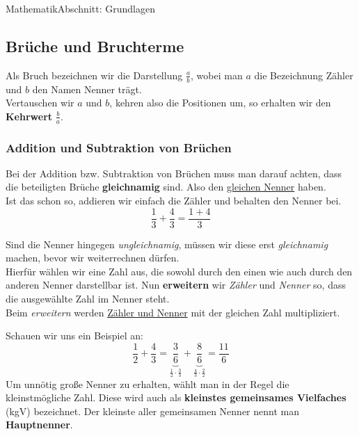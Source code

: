 \documentclass[11pt,twocolumn,oneside,openany,headings=optiontotoc,11pt,numbers=noenddot]{article}
\begin{document}
\begin{worksheet}{}{Mathematik}{Abschnitt: Grundlagen}
		\subsection{Brüche und Bruchterme}
		Als Bruch bezeichnen wir die Darstellung \(\frac{a}{b}\), wobei man \(a\) die Bezeichnung Zähler und \(b\) den Namen Nenner trägt.\\
		Vertauschen wir \(a\) und \(b\), kehren also die Positionen um, so erhalten wir den \textbf{Kehrwert} \(\frac{b}{a}\).\\
		\subsubsection*{Addition und Subtraktion von Brüchen}
		Bei der Addition bzw. Subtraktion von Brüchen muss man darauf achten, dass die beteiligten Brüche \textbf{gleichnamig} sind. Also den \underline{gleichen Nenner} haben.\\
		Ist das schon so, addieren wir einfach die Zähler und behalten den Nenner bei. \[\frac{1}{3} + \frac{4}{3} = \frac{1+4}{3}\]
		\par\noindent
		Sind die Nenner hingegen \textit{ungleichnamig}, müssen wir diese erst \textit{gleichnamig} machen, bevor wir weiterrechnen dürfen.\\
		Hierfür wählen wir eine Zahl aus, die sowohl durch den einen wie auch durch den anderen Nenner darstellbar ist. Nun \textbf{erweitern} wir \textit{Zähler} und \textit{Nenner} so, dass die ausgewählte Zahl im Nenner steht.\\
		Beim \textit{erweitern} werden \underline{Zähler und Nenner} mit der gleichen Zahl multipliziert.\\
		\par\noindent
		Schauen wir uns ein Beispiel an:
		\[\frac{1}{2} + \frac{4}{3} = \underbrace{\frac{3}{6}}_{\frac{1}{2}\cdot{}\frac{3}{3}} + \underbrace{\frac{8}{6}}_{\frac{4}{3}\cdot{}\frac{2}{2}} = \frac{11}{6}\]
		Um unnötig große Nenner zu erhalten, wählt man in der Regel die kleinstmögliche Zahl. Diese wird auch als \textbf{kleinstes gemeinsames Vielfaches} (kgV) bezeichnet. Der kleinste aller gemeinsamen Nenner nennt man \textbf{Hauptnenner}.

\end{worksheet}
\end{document}

